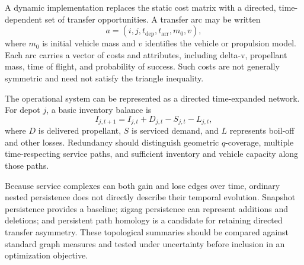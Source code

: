 \documentclass[11pt]{article}
\begin{document}
A dynamic implementation replaces the static cost matrix with a directed,
time-dependent set of transfer opportunities. A transfer arc may be written
\begin{equation}
  a=(i,j,t_{\mathrm{dep}},t_{\mathrm{arr}},m_0,v),
\end{equation}
where $m_0$ is initial vehicle mass and $v$ identifies the vehicle or propulsion
model. Each arc carries a vector of costs and attributes, including delta-v,
propellant mass, time of flight, and probability of success. Such costs are not
generally symmetric and need not satisfy the triangle inequality.

The operational system can be represented as a directed time-expanded network.
For depot $j$, a basic inventory balance is
\begin{equation}
  I_{j,t+1}=I_{j,t}+D_{j,t}-S_{j,t}-L_{j,t},
\end{equation}
where $D$ is delivered propellant, $S$ is serviced demand, and $L$ represents
boil-off and other losses. Redundancy should distinguish geometric $q$-coverage,
multiple time-respecting service paths, and sufficient inventory and vehicle
capacity along those paths.

Because service complexes can both gain and lose edges over time, ordinary
nested persistence does not directly describe their temporal evolution. Snapshot
persistence provides a baseline; zigzag persistence can represent additions and
deletions; and persistent path homology is a candidate for retaining directed
transfer asymmetry. These topological summaries should be compared against
standard graph measures and tested under uncertainty before inclusion in an
optimization objective.
\end{document}
